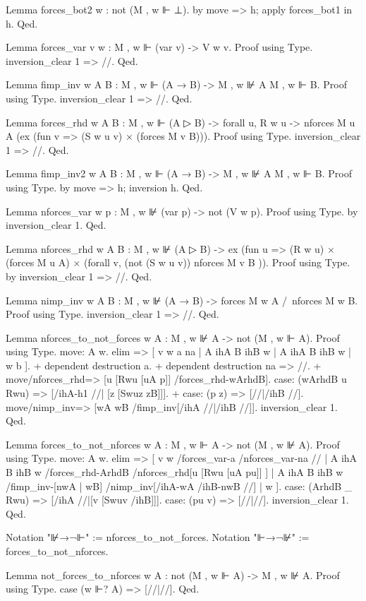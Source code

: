 \begin{spverbatim}
Lemma forces_bot2 {w} : not (M , w ⊩ ⊥).
  by move => h; apply forces_bot1 in h.
Qed.

Lemma forces_var {v w} : M , w ⊩ (var v) -> V w v.
Proof using Type. inversion_clear 1 => //. Qed.

Lemma fimp_inv {w A B} : M , w ⊩ (A → B) -> M , w ⊮ A \/ M , w ⊩ B.
Proof using Type. inversion_clear 1 => //. Qed.

Lemma forces_rhd {w A B} :
  M , w ⊩ (A ▷ B) ->
      forall {u}, R w u -> nforces M u A \/ (ex (fun v => (S w u v) × (forces M v B))).
Proof using Type. inversion_clear 1 => //. Qed.

Lemma fimp_inv2 {w A B} : M , w ⊩ (A → B) -> M , w ⊮ A \/ M , w ⊩ B.
Proof using Type.
  by move => h; inversion h.
Qed.

Lemma nforces_var {w p} : M , w ⊮ (var p) -> not (V w p).
Proof using Type.
  by inversion_clear 1.
Qed.

Lemma nforces_rhd {w A B} :
  M , w ⊮ (A ▷ B) ->
     ex (fun u => (R w u) × (forces M u A) ×
           (forall v, (not (S w u v)) \/ nforces M v B )).
Proof using Type. by inversion_clear 1 => //. Qed.

Lemma nimp_inv {w A B} :
  M , w ⊮ (A → B) ->
      forces M w A /\ nforces M w B.
Proof using Type. inversion_clear 1 => //. Qed.

Lemma nforces_to_not_forces {w A} : M , w ⊮ A -> not (M , w ⊩ A).
Proof using Type.
  move: A w.
  elim => [ v w a na | A ihA B ihB w | A ihA B ihB w | w b ].
  +  dependent destruction a.
  + dependent destruction na => //.
  + move/nforces_rhd=> [u [Rwu [uA p]] /forces_rhd-wArhdB].
    case: (wArhdB u Rwu) => [/ihA-h1 //| [z [Swuz zB]]].
  + case: (p z) => [//|/ihB //].
    move/nimp_inv=> [wA wB /fimp_inv[/ihA //|/ihB //]].
  inversion_clear 1.
Qed.

Lemma forces_to_not_nforces {w A} : M , w ⊩ A -> not (M , w ⊮ A).
Proof using Type.
  move: A w.
  elim => [ v w /forces_var-a /nforces_var-na //
         | A ihA B ihB w /forces_rhd-ArhdB /nforces_rhd[u [Rwu [uA pu]] ]
         | A ihA B ihB w /fimp_inv-[nwA | wB] /nimp_inv[/ihA-wA /ihB-nwB //]
         | w ].
  case: (ArhdB _ Rwu) => [/ihA //|[v [Swuv /ihB]]].
  case: (pu v) => [//|//].
  inversion_clear 1.
Qed.

Notation "⊮→¬⊩" := nforces_to_not_forces.
Notation "⊩→¬⊮" := forces_to_not_nforces.

Lemma not_forces_to_nforces {w A} : not (M , w ⊩ A) -> M , w ⊮ A.
Proof using Type.
  case (w ⊩? A) => [//|//].
Qed.


\end{spverbatim}
